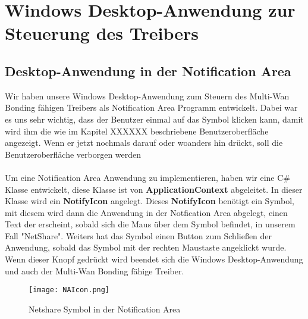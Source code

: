 \chapter{Windows Desktop-Anwendung zur Steuerung des Treibers}
\label{chap:WindowsDesktop-AnwendungzurSteuerungdesTreibers}

\section{Desktop-Anwendung in der Notification Area}
Wir haben unsere Windows Desktop-Anwendung zum Steuern des Multi-Wan Bonding fähigen Treibers als Notification Area Programm entwickelt. Dabei war es uns sehr wichtig, dass der Benutzer einmal auf das Symbol klicken kann, damit wird ihm die wie im Kapitel XXXXXX beschriebene Benutzeroberfläche angezeigt. Wenn er jetzt nochmals darauf oder woanders hin drückt, soll die Benutzeroberfläche verborgen werden
\\\\
Um eine Notification Area Anwendung zu implementieren, haben wir eine C\# Klasse entwickelt, diese Klasse ist von \textbf{ApplicationContext} abgeleitet. In dieser Klasse wird ein \textbf{NotifyIcon} angelegt. Dieses \textbf{NotifyIcon} benötigt ein Symbol, mit diesem wird dann die Anwendung in der Notfication Area abgelegt, einen Text der erscheint, sobald sich die Maus über dem Symbol befindet, in unserem Fall "NetShare". Weiters hat das Symbol einen Button zum Schließen der Anwendung, sobald das Symbol mit der rechten Maustaste angeklickt wurde. Wenn dieser Knopf gedrückt wird beendet sich die Windows Desktop-Anwendung und auch der Multi-Wan Bonding fähige Treiber.
\begin{figure}[H]
    \centering
    \texttt{[image: NAIcon.png]}
    \caption[NotificationArea]{Netshare Symbol in der Notification Area} 
\end{figure}
\noindent

\newpage
